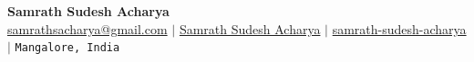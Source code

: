 \documentclass[letterpaper,11pt]{article}
\makeatletter
\newcommand{\resumeItem}[1]{
  \item\small{
    {#1 \vspace{-1pt}}
  }
}
\newcommand{\resumeSubheading}[4]{
  \vspace{-1pt}\item
    \begin{tabular*}{\textwidth}[t]{l@{\extracolsep{\fill}}r}
      \textbf{#1} & {\color{dark-grey}\small #2}\vspace{1pt}\\ %
      \textit{#3} & {\color{dark-grey} \small #4}\\ %
    \end{tabular*}\vspace{-4pt}
}
\newcommand{\resumeSubHeadingListStart}{\begin{itemize}[leftmargin=0in, label={}]}
\newcommand{\resumeSubHeadingListEnd}{\end{itemize}}
\newcommand{\resumeItemListStart}{\begin{itemize}}
\newcommand{\resumeItemListEnd}{\end{itemize}\vspace{0pt}}
\makeatother
\begin{document}
\begin{center}
    \textbf{\Huge Samrath Sudesh Acharya} \\ \vspace{5pt}
    \hspace{1pt} \faEnvelope \hspace{2pt} \href{mailto:samrathsacharya@gmail.com}{samrathsacharya@gmail.com} \hspace{1pt} $|$ 
    \hspace{1pt} \faLinkedinSquare \hspace{2pt} \href{https://www.linkedin.com/in/samrath-sudesh-acharya/}{Samrath Sudesh Acharya} \hspace{1pt} $|$
    \hspace{1pt} \faGithub \hspace{2pt} \href{https://github.com/samrath-sudesh-acharya}{samrath-sudesh-acharya}
    \hspace{1pt} $|$
    \newline
    \hspace{1pt} \faMapMarker \hspace{2pt}\texttt{Mangalore, India} 
    \\ \vspace{-3pt}
\end{center}

        
    
\end{document}
